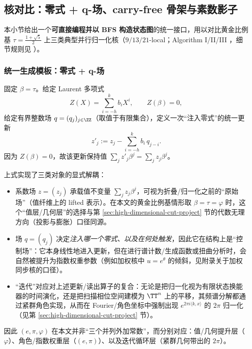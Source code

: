 \subsection{核对比：零式 + q-场、carry-free 骨架与素数影子}\label{sec:A-kernel-compare-main}
本小节给出一个\textbf{可直接编程并以 BFS 构造状态图}的统一接口，用以对比黄金比例基 $\tau=\frac{1+\sqrt5}{2}$ 上三类典型并行归一化核（$9/13/21$-local；Algorithm I/II/III \cite{SvobodovaAAMPVIIIParallelAddition}，细节规则见 \cite{FrougnyHellerPelantovaSvobodovaParallelAlgorithmsSlides}）。

\subsubsection{统一生成模板：零式 + q-场}
固定 $\beta=\tau$。给定 Laurent 多项式
\[
Z(X)=\sum_{i=-h}^{k} b_i X^i,\qquad Z(\beta)=0,
\]
给定有界整数场 $q=(q_j)_{j\in\ZZ}$（取值于有限集合），定义一次“注入零式”的统一更新
\[
z'_j:=z_j-\sum_{i=-h}^{k} b_i\,q_{j-i}.
\]
因为 $Z(\beta)=0$，故该更新保持值 $\sum_j z'_j\beta^j=\sum_j z_j\beta^j$。

\begin{remark}\label{rem:z-q-iter-epi-phi}
上式实现了三类对象的显式解耦：
\begin{itemize}
  \item 系数场 $z=(z_j)$ 承载值不变量 \(\sum_j z_j\beta^j\)，可视为折叠/归一化之前的“原始场”（值纤维上的 lifted 表示）。在本文的黄金比例基情形取 \(\beta=\tau=\varphi\) 时，这个“值层/几何层”的选择与第 \ref{sec:high-dimensional-cut-project} 节的代数无理方向（投影与膨胀）口径同源。
  \item 场 $q=(q_j)$ 决定\emph{注入哪一个零式、以及在何处触发}，因此它在结构上是“控制场”：它本身线性地进入更新，但在进行谱计数/生成函数或扭曲分析时，会自然被提升为指数权重参数（例如加权核中 \(u=e^\theta\) 的倾斜，见附录关于加权同步核的口径）。
  \item “迭代”对应对上述更新/读出算子的复合：无论是把归一化视为有限状态换能器的时间演化，还是把扫描相位空间建模为 \(\TT^n\) 上的平移，其频谱分解都通过紧群角色实现，从而在 Fourier/角色坐标中强制出现 \(e^{2\pi i\langle k,x\rangle}\) 的 \(2\pi\) 归一化（见第 \ref{sec:high-dimensional-cut-project} 节）。
\end{itemize}
因此 \((e,\pi,\varphi)\) 在本文并非“三个并列外加常数”，而分别对应：值/几何提升层（\(\varphi\)）、角色/指数权重层（\((e,\pi)\)）、以及迭代循环层（紧群几何带出的 \(2\pi\)）。
\end{remark}

